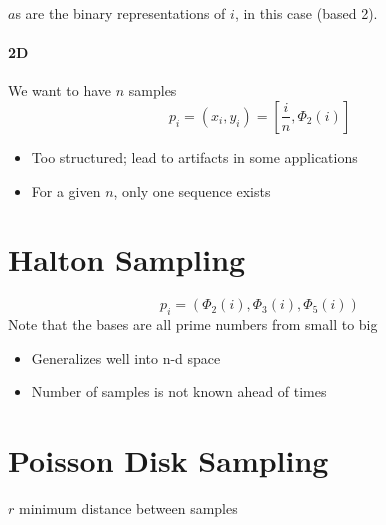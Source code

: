   $ a $s are the binary representations of $ i $, in this case (based 2).

  \paragraph{2D} We want to have $ n $ samples
  \begin{equation}
    p_{i}
      = \left( x_{i}, y_{i} \right)
      = \left[ \frac{i}{n}, \Phi_{2}\left( i \right) \right]
  \end{equation}

  \begin{itemize}
    \item Too structured; lead to artifacts in some applications
    \item For a given $ n $, only one sequence exists
  \end{itemize}

\section{Halton Sampling}

  \begin{equation}
    p_{i} =
    \left(
      \Phi_{2} \left( i \right),
      \Phi_{3} \left( i \right),
      \Phi_{5} \left( i \right)
    \right)
  \end{equation}
  Note that the bases are all prime numbers from small to big

  \begin{itemize}
    \item Generalizes well into n-d space
    \item Number of samples is not known ahead of times
  \end{itemize}

\section{Poisson Disk Sampling}

  $ r $ minimum distance between samples


